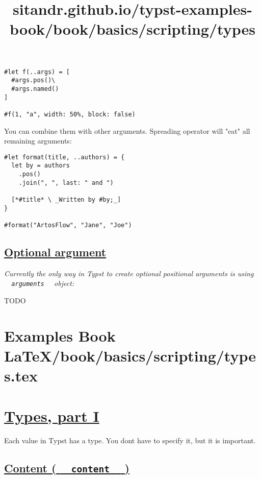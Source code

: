 \begin{verbatim}
#let f(..args) = [
  #args.pos()\
  #args.named()
]

#f(1, "a", width: 50%, block: false)
\end{verbatim}

\pandocbounded{}

You can combine them with other arguments. Spreading operator will "eat"
all remaining arguments:

\begin{verbatim}
#let format(title, ..authors) = {
  let by = authors
    .pos()
    .join(", ", last: " and ")

  [*#title* \ _Written by #by;_]
}

#format("ArtosFlow", "Jane", "Joe")
\end{verbatim}

\pandocbounded{}

\subsection{\texorpdfstring{\hyperref[optional-argument]{Optional
argument}}{Optional argument}}\label{optional-argument}

\emph{Currently the only way in Typst to create optional positional
arguments is using \texttt{\ }{\texttt{\ arguments\ }}\texttt{\ }
object:}

TODO


\section{Examples Book LaTeX/book/basics/scripting/types.tex}
\title{sitandr.github.io/typst-examples-book/book/basics/scripting/types}

\section{\texorpdfstring{\hyperref[types-part-i]{Types, part
I}}{Types, part I}}\label{types-part-i}

Each value in Typst has a type. You don\textquotesingle t have to
specify it, but it is important.

\subsection{\texorpdfstring{\hyperref[content-content]{Content (
\texttt{\ }{\texttt{\ content\ }}\texttt{\ }
)}}{Content (   content   )}}\label{content-content}

